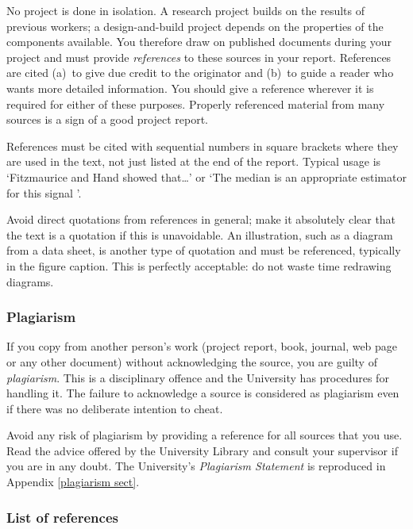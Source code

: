 \documentclass[a4paper,12pt]{article}
\begin{document}
No project is done in isolation. A research project builds on the results of previous workers; a design-and-build project depends on the properties of the components available. You therefore draw on published documents during your project and must provide \emph{references} to these sources in your report. References are cited (a)~to give due credit to the originator and (b)~to guide a reader who wants more detailed information. You should give a reference wherever it is required for either of these purposes. Properly referenced material from many sources is a sign of a good project report. 

References must be cited with sequential numbers in square brackets where they are used in the text, not just listed at the end of the report. Typical usage is `Fitzmaurice and Hand \cite{gmf87} showed that\dots' or `The median is an appropriate estimator for this signal \cite{gmf87}'.

Avoid direct quotations from references in general; make it absolutely clear that the text is a quotation if this is unavoidable. An illustration, such as a diagram from a data sheet, is another type of quotation and must be referenced, typically in the figure caption. This is perfectly acceptable: do not waste time redrawing diagrams.

\subsubsection{Plagiarism}

If you copy from another person's work (project report, book, journal, web page or any other document) without acknowledging the source, you are guilty of \emph{plagiarism}. This is a disciplinary offence and the University has procedures for handling it. The failure to acknowledge a source is considered as plagiarism even if there was no deliberate intention to cheat. 

Avoid any risk of plagiarism by providing a reference for all sources that you use. Read the advice offered by the University Library and consult your supervisor if you are in any doubt. The University's \emph{Plagiarism Statement} is reproduced in Appendix \ref{plagiarism sect}.

\subsubsection{List of references}
\end{document}
